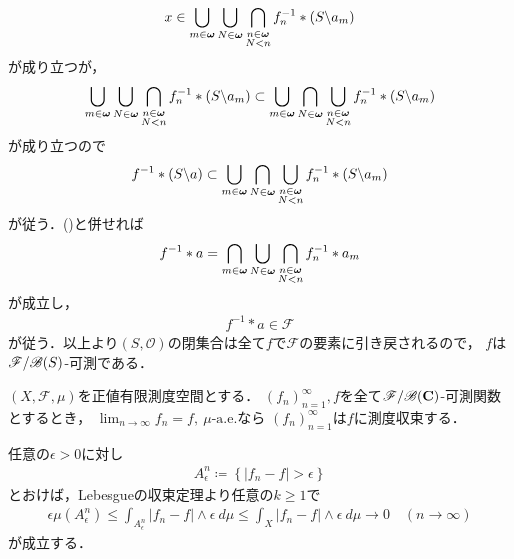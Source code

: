 \begin{prf}
\begin{align}
				x \in \bigcup_{m \in {\boldsymbol \omega}} \bigcup_{N \in {\boldsymbol \omega}} \bigcap_{\substack{n \in {\boldsymbol \omega} \\ N < n}} 
				f_n^{-1} \ast (S \backslash a_m)
			\end{align}
			が成り立つが，
			\begin{align}
				\bigcup_{m \in {\boldsymbol \omega}} \bigcup_{N \in {\boldsymbol \omega}} \bigcap_{\substack{n \in {\boldsymbol \omega} \\ N < n}} 
				f_n^{-1} \ast (S \backslash a_m)
				\subset \bigcup_{m \in {\boldsymbol \omega}} \bigcap_{N \in {\boldsymbol \omega}} \bigcup_{\substack{n \in {\boldsymbol \omega} \\ N < n}} 
				f_n^{-1} \ast (S \backslash a_m)
			\end{align}
			が成り立つので
			\begin{align}
				f^{-1} \ast (S \backslash a) \subset
				\bigcup_{m \in {\boldsymbol \omega}} \bigcap_{N \in {\boldsymbol \omega}} \bigcup_{\substack{n \in {\boldsymbol \omega} \\ N < n}} 
				f_n^{-1} \ast (S \backslash a_m) 
			\end{align}
			が従う．()と併せれば
			\begin{align}
				f^{-1} \ast a =
				\bigcap_{m \in {\boldsymbol \omega}} \bigcup_{N \in {\boldsymbol \omega}} \bigcap_{\substack{n \in {\boldsymbol \omega} \\ N < n}} f_n^{-1} \ast a_m
			\end{align}
			が成立し，
			\begin{align}
				f^{-1} \ast a \in \mathscr{F}
			\end{align}
			が従う．以上より$(S,\mathscr{O})$の閉集合は全て$f$で$\mathscr{F}$の要素に引き戻されるので，
			$f$は$\mathscr{F}/\mathscr{B}(S)$-可測である．
			\QED
		\end{prf}
		
		\begin{screen}
			\begin{dfn}[概収束すれば測度収束する]
				$(X,\mathscr{F},\mu)$を正値有限測度空間とする．
				$(f_n)_{n=1}^\infty,f$を全て$\mathscr{F}/\mathscr{B}(\mathbf{C})$-可測関数とするとき，
				$\lim_{n \to \infty} f_n = f,\ \mbox{$\mu$-a.e.}$なら
				$(f_n)_{n=1}^\infty$は$f$に測度収束する．
			\end{dfn}
		\end{screen}
		
		\begin{prf}
			任意の$\epsilon > 0$に対し
			\begin{align}
				A^n_\epsilon \coloneqq \left\{ |f_n - f| > \epsilon \right\}
			\end{align}
			とおけば，Lebesgueの収束定理より任意の$k \geq 1$で
			\begin{align}
				\epsilon \mu\left(A^n_\epsilon\right)
				\leq \int_{A^n_\epsilon} |f_n - f| \wedge \epsilon\ d\mu
				\leq \int_{X} |f_n - f| \wedge \epsilon\ d\mu
				\longrightarrow 0
				\quad (n \longrightarrow \infty)
			\end{align}
			が成立する．
			\QED
		\end{prf}
		
